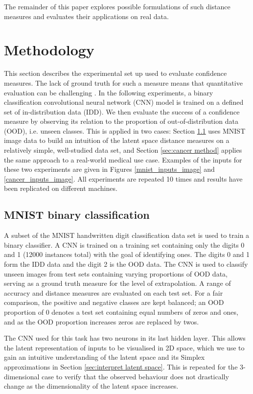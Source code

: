 \documentclass{article}
\begin{document}
The remainder of this paper explores possible formulations of such distance measures and evaluates their applications on real data.



\section{Methodology}

This section describes the experimental set up used to evaluate confidence measures. The lack of ground truth for such a measure means that quantitative evaluation can be challenging \cite{papernot_deep_2018}. In the following experiments, a binary classification convolutional neural network (CNN) model is trained on a defined set of in-distribution data (IDD). We then evaluate the success of a confidence measure by observing its relation to the proportion of out-of-distribution data (OOD), i.e. unseen classes.
This is applied in two cases: Section \ref{sec:mnist method} uses MNIST image data to build an intuition of the latent space distance measures on a relatively simple, well-studied data set, and Section \ref{sec:cancer method} applies the same approach to a real-world medical use case. Examples of the inputs for these two experiments are given in Figures \ref{mnist_inputs_image} and \ref{cancer_inputs_image}.
All experiments are repeated 10 times and results have been replicated on different machines.


\subsection{MNIST binary classification}
\label{sec:mnist method}
A subset of the MNIST handwritten digit classification data set \cite{deng2012mnist} is used to train a binary classifier.
A CNN is trained on a training set containing only the digits 0 and 1 (12000 instances total) with the goal of identifying ones.
The digits 0 and 1 form the IDD data and the digit 2 is the OOD data. The CNN is used to classify unseen images from test sets containing varying proportions of OOD data, serving as a ground truth measure for the level of extrapolation.
A range of accuracy and distance measures  are evaluated on each test set.
For a fair comparison, the positive and negative classes are kept balanced; an OOD proportion of 0 denotes a test set containing equal numbers of zeros and ones, and as the OOD proportion increases zeros are replaced by twos.

The CNN used for this task has two neurons in its last hidden layer. This allows the latent representation of inputs to be visualised in 2D space, which we use to gain an intuitive understanding of the latent space and its Simplex approximations in Section \ref{sec:interpret latent space}. This is repeated for the 3-dimensional case to verify that the observed behaviour does not drastically change as the dimensionality of the latent space increases.
\end{document}
